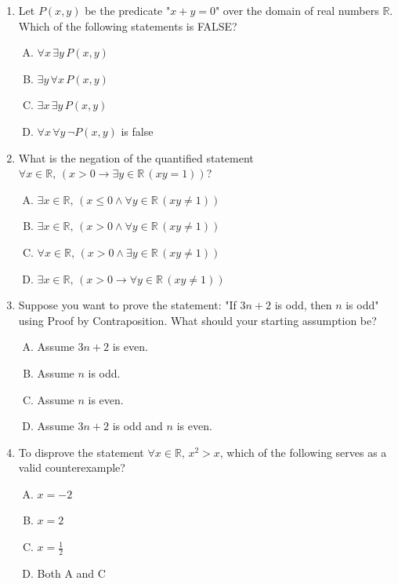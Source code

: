 \documentclass[12pt]{article}
\begin{document}
\begin{enumerate}[1.]
        \item{Let $P(x, y)$ be the predicate "$x + y = 0$" over the domain of real numbers $\mathbb{R}$. Which of the following statements is FALSE?}
        \begin{enumerate}[A.]
                \item{$\forall x \, \exists y \, P(x, y)$}
                \item{$\exists y \, \forall x \, P(x, y)$}
                \item{$\exists x \, \exists y \, P(x, y)$}
                \item{$\forall x \, \forall y \, \neg P(x, y)$ is false}
            \end{enumerate}
\newpage            
        \item{What is the negation of the quantified statement $\forall x \in \mathbb{R}, \, (x > 0 \to \exists y \in \mathbb{R} \, (xy = 1))$?}
        \begin{enumerate}[A.]
                \item{$\exists x \in \mathbb{R}, \, (x \le 0 \wedge \forall y \in \mathbb{R} \, (xy \neq 1))$}
                \item{$\exists x \in \mathbb{R}, \, (x > 0 \wedge \forall y \in \mathbb{R} \, (xy \neq 1))$}
                \item{$\forall x \in \mathbb{R}, \, (x > 0 \wedge \exists y \in \mathbb{R} \, (xy \neq 1))$}
                \item{$\exists x \in \mathbb{R}, \, (x > 0 \to \forall y \in \mathbb{R} \, (xy \neq 1))$}
            \end{enumerate}
            
        \item{Suppose you want to prove the statement: "If $3n + 2$ is odd, then $n$ is odd" using Proof by Contraposition. What should your starting assumption be?}
        \begin{enumerate}[A.]
                \item{Assume $3n + 2$ is even.}
                \item{Assume $n$ is odd.}
                \item{Assume $n$ is even.}
                \item{Assume $3n + 2$ is odd and $n$ is even.}
            \end{enumerate}
            
        \item{To disprove the statement $\forall x \in \mathbb{R}, \, x^2 > x$, which of the following serves as a valid counterexample?}
            \begin{enumerate}[A.]
                \item{$x = -2$}
                \item{$x = 2$}
                \item{$x = \frac{1}{2}$}
                \item{Both A and C}
            \end{enumerate}
            

\end{enumerate}
\end{document}
